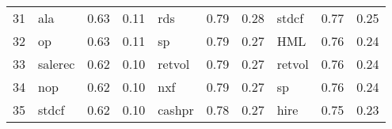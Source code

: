 \documentclass[12pt]{article}
\begin{document}
\begin{landscape}
\begin{footnotesize}
\begin{longtable}{l|lcc|lcc|lcc}
			31                    & ala                         & 0.63                                                                                 & 0.11                            & rds                         & 0.79                                                                                 & 0.28                            & stdcf                       & 0.77                                                                                 & 0.25                           \\
			32                    & op                          & 0.63                                                                                 & 0.11                            & sp                          & 0.79                                                                                 & 0.27                            & HML                         & 0.76                                                                                 & 0.24                           \\
			33                    & salerec                     & 0.62                                                                                 & 0.10                            & retvol                      & 0.79                                                                                 & 0.27                            & retvol                      & 0.76                                                                                 & 0.24                           \\
			34                    & nop                         & 0.62                                                                                 & 0.10                            & nxf                         & 0.79                                                                                 & 0.27                            & sp                          & 0.76                                                                                 & 0.24                           \\
			35                    & stdcf                       & 0.62                                                                                 & 0.10                            & cashpr                      & 0.78                                                                                 & 0.27                            & hire                        & 0.75                                                                                 & 0.23                           \\

\end{longtable}
\end{footnotesize}
\end{landscape}
\end{document}
